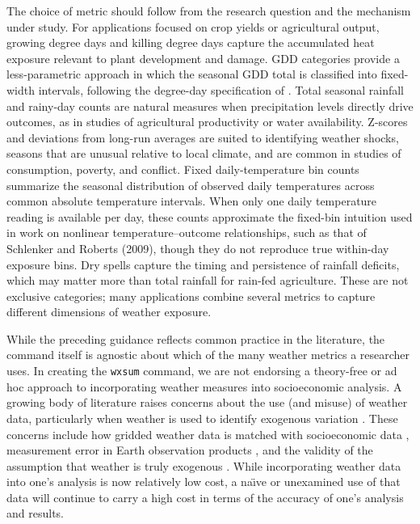 The choice of metric should follow from the research question and the mechanism under study. For applications focused on crop yields or agricultural output, growing degree days and killing degree days capture the accumulated heat exposure relevant to plant development and damage. GDD categories provide a less-parametric approach in which the seasonal GDD total is classified into fixed-width intervals, following the degree-day specification of \citet{DescheneGreenstone07}. Total seasonal rainfall and rainy-day counts are natural measures when precipitation levels directly drive outcomes, as in studies of agricultural productivity or water availability. Z-scores and deviations from long-run averages are suited to identifying weather shocks, seasons that are unusual relative to local climate, and are common in studies of consumption, poverty, and conflict. Fixed daily-temperature bin counts summarize the seasonal distribution of observed daily temperatures across common absolute temperature intervals. When only one daily temperature reading is available per day, these counts approximate the fixed-bin intuition used in work on nonlinear temperature--outcome relationships, such as that of Schlenker and Roberts (2009), though they do not reproduce true within-day exposure bins. Dry spells capture the timing and persistence of rainfall deficits, which may matter more than total rainfall for rain-fed agriculture. These are not exclusive categories; many applications combine several metrics to capture different dimensions of weather exposure.

While the preceding guidance reflects common practice in the literature, the command itself is agnostic about which of the many weather metrics a researcher uses. In creating the \texttt{wxsum} command, we are not endorsing a theory-free or ad hoc approach to incorporating weather measures into socioeconomic analysis. A growing body of literature raises concerns about the use (and misuse) of weather data, particularly when weather is used to identify exogenous variation \citep{BenamiEtAl26}. These concerns include how gridded weather data is matched with socioeconomic data \citep{MichlerEtAl22}, measurement error in Earth observation products \citep{ProctorEtAl23, JosephsonEtAl26}, and the validity of the assumption that weather is truly exogenous \citep{Sarsons15, Mellon2023-un}. While incorporating weather data into one's analysis is now relatively low cost, a na\"{\i}ve or unexamined use of that data will continue to carry a high cost in terms of the accuracy of one's analysis and results.


